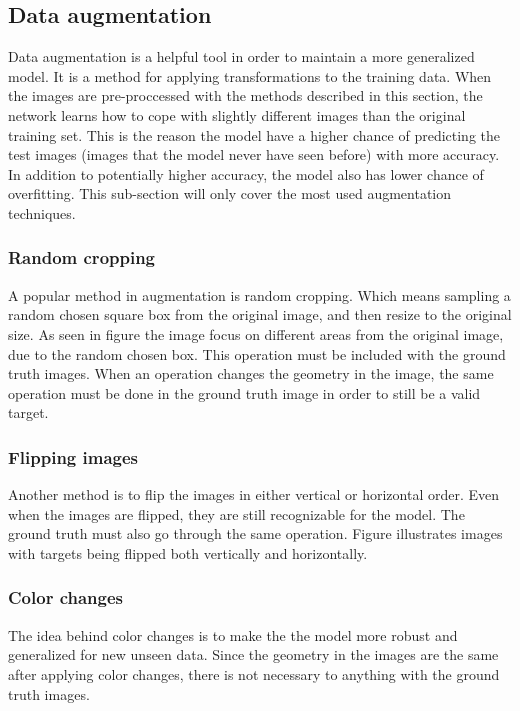 \documentclass[USenglish]{ifimaster}  %
\begin{document}
\subsection{Data augmentation}
Data augmentation is a helpful tool in order to maintain a more generalized model. It is a method for applying transformations to the training data. When the images are pre-proccessed with the methods described in this section, the network learns how to cope with slightly different images than the original training set. This is the reason the model have a higher chance of predicting the test images (images that the model never have seen before) with more accuracy. In addition to potentially higher accuracy, the model also has lower chance of overfitting. This sub-section will only cover the most used augmentation techniques.  
\subsubsection{Random cropping}
A popular method in augmentation is random cropping. Which means sampling a random chosen square box from the original image, and then resize to the original size. As seen in figure  the image focus on different areas from the original image, due to the random chosen box. This operation must be included with the ground truth images. When an operation changes the geometry in the image, the same operation must be done in the ground truth image in order to still be a valid target. 
\subsubsection{Flipping images}
Another method is to flip the images in either vertical or horizontal order. Even when the images are flipped, they are still recognizable for the model. The ground truth must also go through the same operation. Figure  illustrates images with targets being flipped both vertically and horizontally.  
\subsubsection{Color changes}
The idea behind color changes is to make the the model more robust and generalized for new unseen data. Since the geometry in the images are the same after applying color changes, there is not necessary to anything with the ground truth images.
\end{document}
